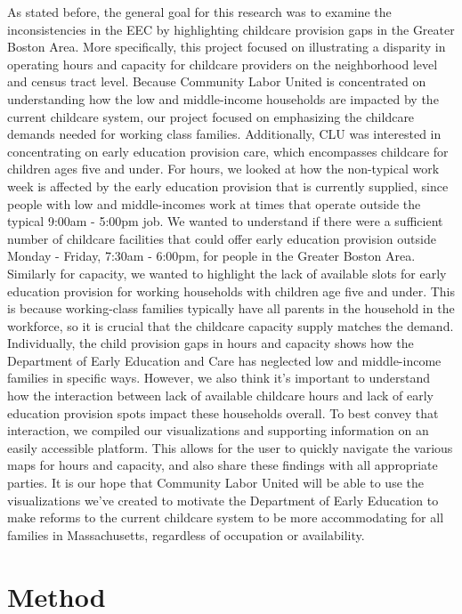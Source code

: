 \documentclass[10pt,letterpaper]{article}
\begin{document}
As stated before, the general goal for this research was to examine the
inconsistencies in the EEC by highlighting childcare provision gaps in
the Greater Boston Area. More specifically, this project focused on
illustrating a disparity in operating hours and capacity for childcare
providers on the neighborhood level and census tract level. Because
Community Labor United is concentrated on understanding how the low and
middle-income households are impacted by the current childcare system,
our project focused on emphasizing the childcare demands needed for
working class families. Additionally, CLU was interested in
concentrating on early education provision care, which encompasses
childcare for children ages five and under. For hours, we looked at how
the non-typical work week is affected by the early education provision
that is currently supplied, since people with low and middle-incomes
work at times that operate outside the typical 9:00am - 5:00pm job. We
wanted to understand if there were a sufficient number of childcare
facilities that could offer early education provision outside Monday -
Friday, 7:30am - 6:00pm, for people in the Greater Boston Area.
Similarly for capacity, we wanted to highlight the lack of available
slots for early education provision for working households with children
age five and under. This is because working-class families typically
have all parents in the household in the workforce, so it is crucial
that the childcare capacity supply matches the demand.\\
Individually, the child provision gaps in hours and capacity shows how
the Department of Early Education and Care has neglected low and
middle-income families in specific ways. However, we also think it's
important to understand how the interaction between lack of available
childcare hours and lack of early education provision spots impact these
households overall. To best convey that interaction, we compiled our
visualizations and supporting information on an easily accessible
platform. This allows for the user to quickly navigate the various maps
for hours and capacity, and also share these findings with all
appropriate parties. It is our hope that Community Labor United will be
able to use the visualizations we've created to motivate the Department
of Early Education to make reforms to the current childcare system to be
more accommodating for all families in Massachusetts, regardless of
occupation or availability.

\section{Method}\label{method}
\end{document}

